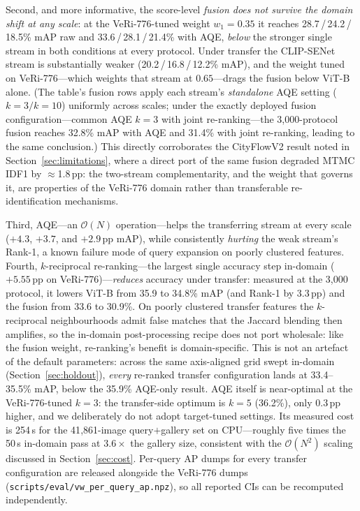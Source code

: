 \documentclass[10pt,a4paper]{article}
\begin{document}
Second, and more informative, the score-level \emph{fusion does not survive the
domain shift at any scale}: at the VeRi-776-tuned weight $w_1{=}0.35$ it
reaches 28.7\,/\,24.2\,/\,18.5\% mAP raw and 33.6\,/\,28.1\,/\,21.4\% with AQE,
\emph{below} the stronger single stream in both conditions at every protocol.
Under transfer the CLIP-SENet stream is substantially weaker
(20.2\,/\,16.8\,/\,12.2\% mAP), and the weight tuned on VeRi-776---which
weights that stream at $0.65$---drags the fusion below ViT-B alone. (The
table's fusion rows apply each stream's \emph{standalone} AQE setting
($k{=}3/k{=}10$) uniformly across scales; under the exactly deployed fusion
configuration---common AQE $k{=}3$ with joint re-ranking---the 3{,}000-protocol
fusion reaches 32.8\% mAP with AQE and 31.4\% with joint re-ranking, leading to
the same conclusion.) This directly corroborates the CityFlowV2 result noted in
Section~\ref{sec:limitations}, where a direct port of the same fusion degraded
MTMC IDF1 by $\approx$1.8\,pp: the two-stream complementarity, and the weight
that governs it, are properties of the VeRi-776 domain rather than transferable
re-identification mechanisms.

Third, AQE---an $\mathcal{O}(N)$ operation---helps the transferring stream at
every scale ($+4.3$, $+3.7$, and $+2.9$\,pp mAP), while consistently
\emph{hurting} the weak stream's Rank-1, a known failure mode of query
expansion on poorly clustered features. Fourth, $k$-reciprocal re-ranking---the
largest single accuracy step in-domain ($+5.55$\,pp on
VeRi-776)---\emph{reduces} accuracy under transfer: measured at the 3{,}000
protocol, it lowers ViT-B from 35.9 to 34.8\% mAP (and Rank-1 by 3.3\,pp) and
the fusion from 33.6 to 30.9\%. On poorly clustered transfer features the
$k$-reciprocal neighbourhoods admit false matches that the Jaccard blending
then amplifies, so the in-domain post-processing recipe does not port
wholesale: like the fusion weight, re-ranking's benefit is domain-specific.
This is not an artefact of the default parameters: across the same
axis-aligned grid swept in-domain (Section~\ref{sec:holdout}), \emph{every}
re-ranked transfer configuration lands at 33.4--35.5\% mAP, below the 35.9\%
AQE-only result. AQE itself is near-optimal at the VeRi-776-tuned $k{=}3$: the
transfer-side optimum is $k{=}5$ (36.2\%), only $0.3$\,pp higher, and we
deliberately do not adopt target-tuned settings. Its measured cost is 254\,s
for the 41{,}861-image query$+$gallery set on CPU---roughly five times the
50\,s in-domain pass at $3.6\times$ the gallery size, consistent with the
$\mathcal{O}(N^{2})$ scaling discussed in Section~\ref{sec:cost}. Per-query AP
dumps for every transfer configuration are released alongside the VeRi-776
dumps (\texttt{scripts/eval/vw\_per\_query\_ap.npz}), so all reported CIs can
be recomputed independently.
\end{document}

